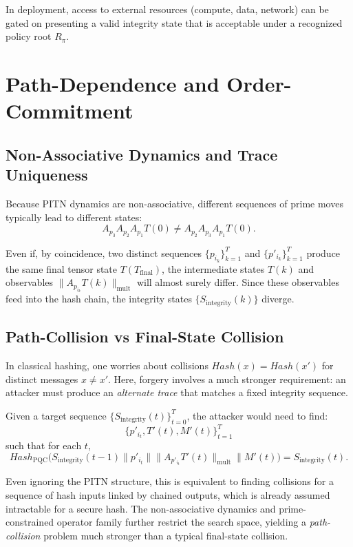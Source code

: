 \documentclass[11pt]{article}
\begin{document}
In deployment, access to external resources (compute, data, network) can be gated on presenting a valid integrity state that is acceptable under a recognized policy root \(R_\pi\).

\section{Path-Dependence and Order-Commitment}

\subsection{Non-Associative Dynamics and Trace Uniqueness}

Because PITN dynamics are non-associative, different sequences of prime moves typically lead to different states:
\[
  A_{p_3}A_{p_2}A_{p_1}T(0) \neq A_{p_2}A_{p_3}A_{p_1}T(0).
\]

Even if, by coincidence, two distinct sequences \(\{p_{i_k}\}_{k=1}^T\) and \(\{p'_{i_k}\}_{k=1}^T\) produce the same final tensor state \(T(T_{\text{final}})\), the intermediate states \(T(k)\) and observables \(\|A_{p_{i_k}}T(k)\|_{\text{mult}}\) will almost surely differ.
Since these observables feed into the hash chain, the integrity states \(\{S_{\text{integrity}}(k)\}\) diverge.

\subsection{Path-Collision vs Final-State Collision}

In classical hashing, one worries about collisions \(Hash(x) = Hash(x')\) for distinct messages \(x \neq x'\).
Here, forgery involves a much stronger requirement:
an attacker must produce an \emph{alternate trace} that matches a fixed integrity sequence.

Given a target sequence \(\{S_{\text{integrity}}(t)\}_{t=0}^T\), the attacker would need to find:
\[
  \{p'_{i_t}, T'(t), M'(t)\}_{t=1}^T
\]
such that for each \(t\),
\[
  Hash_{\text{PQC}}\big(
    S_{\text{integrity}}(t-1)
    \parallel p'_{i_t}
    \parallel \|A_{p'_{i_t}}T'(t)\|_{\text{mult}}
    \parallel M'(t)
  \big)
  = S_{\text{integrity}}(t).
\]

Even ignoring the PITN structure, this is equivalent to finding collisions for a sequence of hash inputs linked by chained outputs, which is already assumed intractable for a secure hash.
The non-associative dynamics and prime-constrained operator family further restrict the search space, yielding a \emph{path-collision} problem much stronger than a typical final-state collision.
\end{document}

